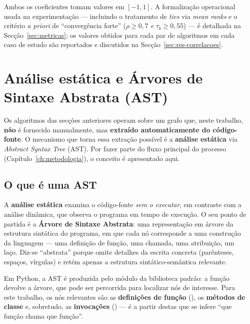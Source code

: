 Ambos os coeficientes tomam valores em $[-1, 1]$. A formalização
operacional usada na experimentação --- incluindo o tratamento de
\emph{ties} via \emph{mean ranks} e o critério \emph{a priori} de
``convergência forte'' ($\rho \geq 0{,}7$ \emph{e}
$\tau_b \geq 0{,}55$) --- é detalhada na Secção~\ref{sec:metricas}; os
valores obtidos para cada par de algoritmos em cada caso de estudo são
reportados e discutidos na Secção~\ref{sec:res-correlacoes}.

\section{Análise estática e Árvores de Sintaxe Abstrata (AST)}
\label{sec:ast}

Os algoritmos das secções anteriores operam sobre um grafo que, neste
trabalho, \textbf{não} é fornecido manualmente, mas \textbf{extraído
automaticamente do código-fonte}. O mecanismo que torna essa extração
possível é a \textbf{análise estática} via \emph{Abstract Syntax
Tree} (AST). Por fazer parte do fluxo principal do processo
(Capítulo~\ref{ch:metodologia}), o conceito é apresentado aqui.

\subsection{O que é uma AST}
\label{sec:ast-conceito}

A \textbf{análise estática} examina o código-fonte \emph{sem o
executar}, em contraste com a análise dinâmica, que observa o programa
em tempo de execução. O seu ponto de partida é a \textbf{Árvore de
Sintaxe Abstrata}: uma representação em árvore da estrutura sintática
do programa, em que cada nó corresponde a uma construção da linguagem
--- uma definição de função, uma chamada, uma atribuição, um laço.
Diz-se ``abstrata'' porque omite detalhes da escrita concreta
(parênteses, espaços, vírgulas) e retém apenas a estrutura
sintático-semântica relevante.

Em Python, a AST é produzida pelo módulo  da biblioteca
padrão: a função  devolve a árvore, que pode
ser percorrida para localizar nós de interesse. Para este trabalho, os
nós relevantes são as \textbf{definições de função}
(), os \textbf{métodos de classe} e, sobretudo, as
\textbf{invocações} () --- é a partir destas que se infere
``que função chama que função''.

